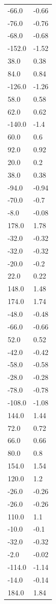 \begin{longtable}{ll}
-66.0 & -0.66 \\
-76.0 & -0.76 \\
-68.0 & -0.68 \\
-152.0 & -1.52 \\
38.0 & 0.38 \\
84.0 & 0.84 \\
-126.0 & -1.26 \\
58.0 & 0.58 \\
62.0 & 0.62 \\
-140.0 & -1.4 \\
60.0 & 0.6 \\
92.0 & 0.92 \\
20.0 & 0.2 \\
38.0 & 0.38 \\
-94.0 & -0.94 \\
-70.0 & -0.7 \\
-8.0 & -0.08 \\
178.0 & 1.78 \\
-32.0 & -0.32 \\
-32.0 & -0.32 \\
-20.0 & -0.2 \\
22.0 & 0.22 \\
148.0 & 1.48 \\
174.0 & 1.74 \\
-48.0 & -0.48 \\
-66.0 & -0.66 \\
52.0 & 0.52 \\
-42.0 & -0.42 \\
-58.0 & -0.58 \\
-28.0 & -0.28 \\
-78.0 & -0.78 \\
-108.0 & -1.08 \\
144.0 & 1.44 \\
72.0 & 0.72 \\
66.0 & 0.66 \\
80.0 & 0.8 \\
154.0 & 1.54 \\
120.0 & 1.2 \\
-26.0 & -0.26 \\
-26.0 & -0.26 \\
110.0 & 1.1 \\
-10.0 & -0.1 \\
-32.0 & -0.32 \\
-2.0 & -0.02 \\
-114.0 & -1.14 \\
-14.0 & -0.14 \\
184.0 & 1.84 \\

\end{longtable}
